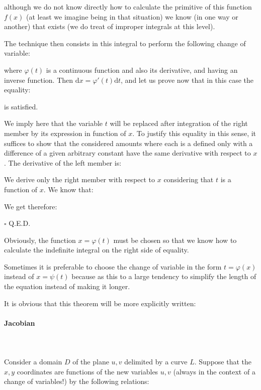 	although we do not know directly how to calculate the primitive of this function $f(x)$ (at least we imagine being in that situation) we know (in one way or another) that exists (we do treat of improper integrals at this level).

	The technique then consists in this integral to perform the following change of variable:
	
	where $\varphi (t)$ is a continuous function and also its derivative, and having an inverse function. Then $\mathrm{d}x=\varphi' (t)\mathrm{d}t$, and let us prove now that in this case the equality:	
	
	is satisfied.
	\begin{dem}
	We imply here that the variable $t$ will be replaced after integration of the right member by its expression in function of $x$. To justify this equality in this sense, it suffices to show that the considered amounts where each is a defined only with a difference of a given arbitrary constant have the same derivative with respect to $x$. The derivative of the left member is:
	
	We derive only the right member with respect to $x$ considering that $t$ is a function of $x$. We know that:
	
	We get therefore:
	
	\begin{flushright}
		$\square$  Q.E.D.
	\end{flushright}
	\end{dem}
	Obviously, the function $x=\varphi (t)$ must be chosen so that we know how to calculate the indefinite integral on the right side of equality.
	\begin{tcolorbox}[title=Remark,colframe=black,arc=10pt]
	Sometimes it is preferable to choose the change of variable in the form $t=\varphi (x)$ instead of $x= \psi(t)$ because as this to a large tendency to simplify the length of the equation instead of making it longer.
	\end{tcolorbox}
	It is obvious that this theorem will be more explicitly written:
	
	
	\pagebreak
	\paragraph{Jacobian}\label{jacobian}\mbox{}\\\\
	Consider a domain $D$ of the plane  $u,v$ delimited by a curve $L$. Suppose that the $x, y$ coordinates are functions of the new variables $u, v$ (always in the context of a change of variables!) by the following relations:
	
